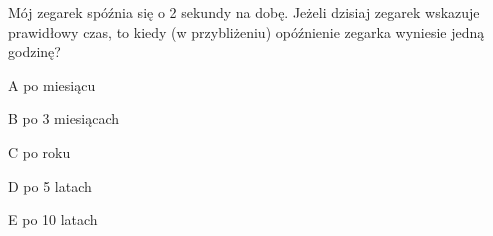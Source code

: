 \begin{tresc}
Mój zegarek spóźnia się o 2 sekundy na dobę. Jeżeli dzisiaj zegarek wskazuje prawidłowy czas, to kiedy (w przybliżeniu) opóźnienie zegarka wyniesie jedną godzinę?
\end{tresc}
\begin{wariant}{A} po miesiącu \end{wariant}
\begin{wariant}{B} po 3 miesiącach \end{wariant}
\begin{wariant}{C} po roku \end{wariant}
\begin{wariant}{D} po 5 latach \end{wariant}
\begin{wariant}{E} po 10 latach \end{wariant}
